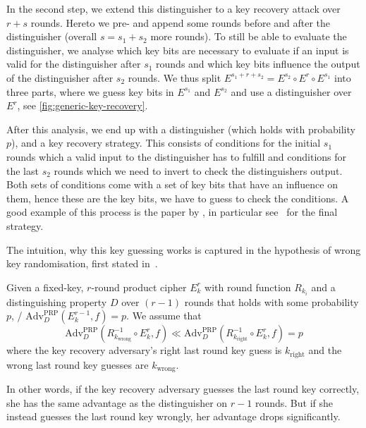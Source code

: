 In the second step, we extend this distinguisher to a key recovery attack over $r+s$ rounds.
Hereto we pre- and append some rounds before and after the distinguisher (overall $s = s_1 + s_2$ more rounds).
To still be able to evaluate the distinguisher, we analyse which key bits are necessary to evaluate if an input is valid for the distinguisher after $s_1$ rounds and which key bits influence the output of the distinguisher after $s_2$ rounds.
We thus split $E^{s_1 + r + s_2} = E^{s_2} \circ E^r \circ E^{s_1}$ into three parts, where we guess key bits in $E^{s_1}$ and $E^{s_2}$ and use a distinguisher over $E^r$, see \cref{fig:generic-key-recovery}.

After this analysis, we end up with a distinguisher (which holds with probability~$p$), and a key recovery strategy.
This consists of conditions for the initial $s_1$ rounds which a valid input to the distinguisher has to fulfill and conditions for the last $s_2$ rounds which we need to invert to check the distinguishers output.
Both sets of conditions come with a set of key bits that have an influence on them, hence these are the key bits, we have to guess to check the conditions.
A good example of this process is the paper by \citeauthor{INDOCRYPT:LalRas17}, in particular see~\cite[Section~6.3, pp.~14f]{INDOCRYPT:LalRas17} for the final strategy.

The intuition, why this key guessing works is captured in the hypothesis of wrong key randomisation, first stated in~\cite[Section~4]{EC:HarKraMas95}.
\begin{hypothesis}\label{hypo:rand}
    Given a fixed-key, $r$-round product cipher $E_k^r$ with round function $R_{k_i}$ and a distinguishing property $D$ over $(r-1)$ rounds that holds with some probability $p$, \ie/ $\mathrm{Adv}_D^\mathrm{PRP}(E_k^{r-1}, f) = p$.
    We assume that
    \begin{equation*}
        \mathrm{Adv}_D^\mathrm{PRP}(R_{k_{\text{wrong}}}^{-1} \circ E_k^r, f) \ll \mathrm{Adv}_D^\mathrm{PRP}(R_{k_{\text{right}}}^{-1} \circ E_k^r, f) = p
    \end{equation*}
    where the key recovery adversary's right last round key guess is $k_{\text{right}}$ and the wrong last round key guesses are $k_{\text{wrong}}$.
\end{hypothesis}
In other words, if the key recovery adversary guesses the last round key correctly, she has the same advantage as the distinguisher on $r-1$ rounds.
But if she instead guesses the last round key wrongly, her advantage drops significantly.

